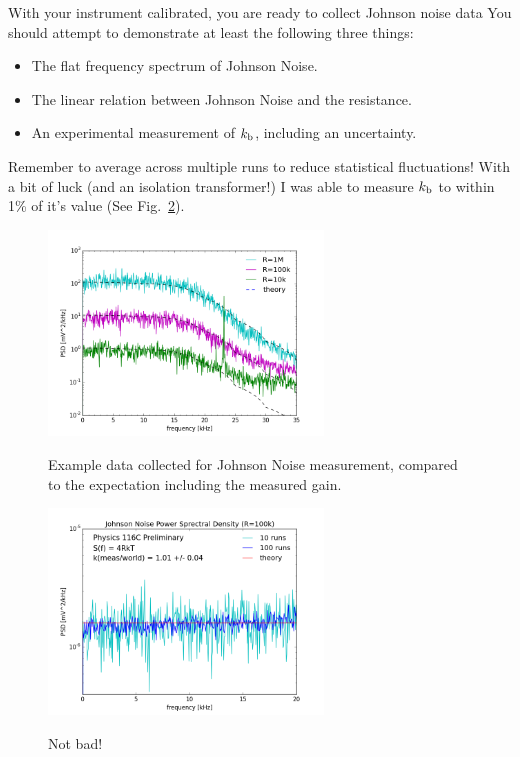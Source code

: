 \documentclass[12pt]{article}
\newcommand{\kb}{k_{\rm b}}
\begin{document}
With your instrument calibrated, you are ready to collect Johnson noise data
You should attempt to demonstrate at least the following three things:
\begin{itemize}
\item The flat frequency spectrum of Johnson Noise.
\item The linear relation between Johnson Noise and the resistance. 
\item An experimental measurement of $\kb$, including an uncertainty.
\end{itemize}
Remember to average across multiple runs to reduce statistical fluctuations!  With a bit of luck (and an isolation transformer!) I was able to measure $\kb$ to within 1\% of it's value (See Fig.~\ref{fig:noise}).

\begin{figure}[htbp]
\begin{center}
{\includegraphics[width=0.65\textwidth]{figs/compare_psd.png}}
\end{center}
\caption{\label{fig:compare_psd}  Example data collected for Johnson Noise measurement, compared to the expectation including the measured gain.}\end{figure}

\begin{figure}[htbp]
\begin{center}
{\includegraphics[width=0.65\textwidth]{figs/noise.png}}
\end{center}
\caption{\label{fig:noise}  Not bad! }\end{figure}
\end{document}
